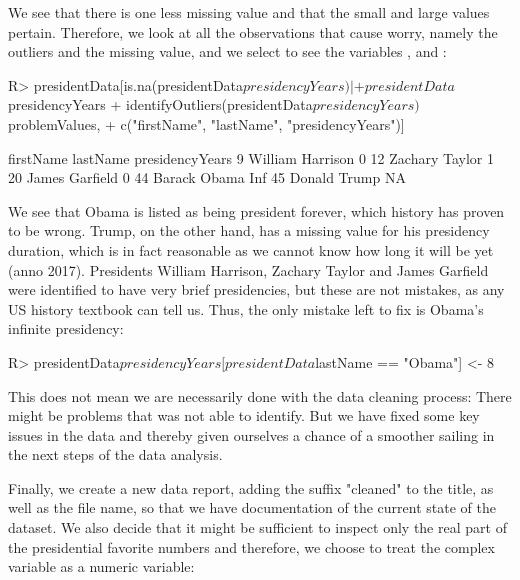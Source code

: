 \documentclass[article,shortnames]{jss}
\begin{document}
We see that there is one less missing value and that the small and large values pertain. Therefore, we look at all the observations that cause worry, namely the outliers and the missing value, and we select to see the variables ,  and :

\begin{Schunk}
\begin{Sinput}
R> presidentData[is.na(presidentData$presidencyYears) | 
+    presidentData$presidencyYears %
+    identifyOutliers(presidentData$presidencyYears)$problemValues, 
+    c("firstName", "lastName", "presidencyYears")]
\end{Sinput}
\begin{Soutput}
   firstName lastName presidencyYears
9    William Harrison               0
12   Zachary   Taylor               1
20     James Garfield               0
44    Barack    Obama             Inf
45    Donald    Trump              NA
\end{Soutput}
\end{Schunk}

We see that Obama is listed as being president forever, which history has proven to be wrong. Trump, on the other hand, has a missing value for his presidency duration, which is in fact reasonable as we cannot know how long it will be yet (anno 2017). Presidents William Harrison, Zachary Taylor and James Garfield were identified to have very brief presidencies, but these are not mistakes, as any US history textbook can tell us. Thus, the only mistake left to fix is Obama's infinite presidency:


\begin{Schunk}
\begin{Sinput}
R> presidentData$presidencyYears[presidentData$lastName == "Obama"] <- 8
\end{Sinput}
\end{Schunk}

This does not mean we are necessarily done with the data cleaning process: There might be problems that  was not able to identify. But we have fixed some key issues in the data and thereby given ourselves a chance of a smoother sailing in the next steps of the data analysis. 

Finally, we create a new data report, adding the suffix "cleaned" to the title, as well as the file name, so that we have documentation of the current state of the dataset. We also decide that it might be sufficient to inspect only the real part of the presidential favorite numbers and therefore, we choose to treat the complex variable  as a numeric variable:
\end{document}
